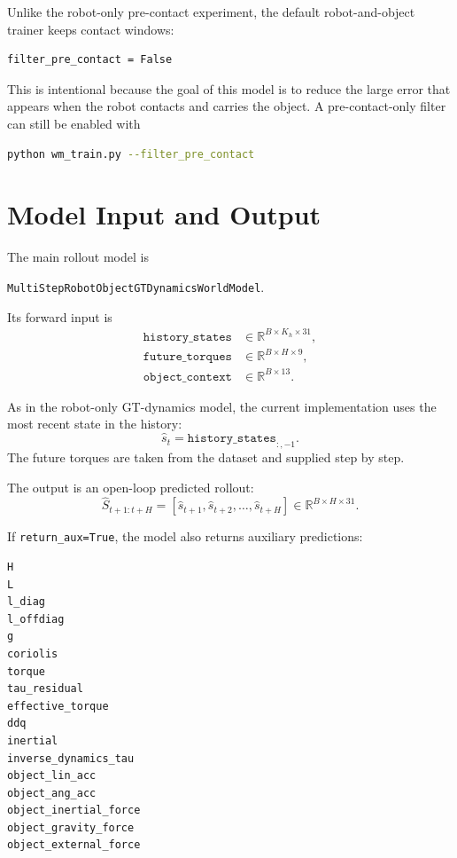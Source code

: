 \documentclass[11pt]{article}
\begin{document}
Unlike the robot-only pre-contact experiment, the default robot-and-object
trainer keeps contact windows:
\begin{lstlisting}
filter_pre_contact = False
\end{lstlisting}
This is intentional because the goal of this model is to reduce the large error
that appears when the robot contacts and carries the object. A pre-contact-only
filter can still be enabled with
\begin{lstlisting}[language=bash]
python wm_train.py --filter_pre_contact
\end{lstlisting}

\section{Model Input and Output}

The main rollout model is
\begin{center}
\texttt{MultiStepRobotObjectGTDynamicsWorldModel}.
\end{center}
Its forward input is
\begin{align}
  \texttt{history\_states} &\in \mathbb{R}^{B \times K_h \times 31}, \\
  \texttt{future\_torques} &\in \mathbb{R}^{B \times H \times 9}, \\
  \texttt{object\_context} &\in \mathbb{R}^{B \times 13}.
\end{align}

As in the robot-only GT-dynamics model, the current implementation uses the most
recent state in the history:
\begin{equation}
  \hat{s}_t = \texttt{history\_states}_{:, -1}.
\end{equation}
The future torques are taken from the dataset and supplied step by step.

The output is an open-loop predicted rollout:
\begin{equation}
  \hat{S}_{t+1:t+H}
  =
  \left[
    \hat{s}_{t+1},
    \hat{s}_{t+2},
    \ldots,
    \hat{s}_{t+H}
  \right]
  \in \mathbb{R}^{B \times H \times 31}.
\end{equation}

If \texttt{return\_aux=True}, the model also returns auxiliary predictions:
\begin{lstlisting}
H
L
l_diag
l_offdiag
g
coriolis
torque
tau_residual
effective_torque
ddq
inertial
inverse_dynamics_tau
object_lin_acc
object_ang_acc
object_inertial_force
object_gravity_force
object_external_force
\end{lstlisting}
\end{document}
